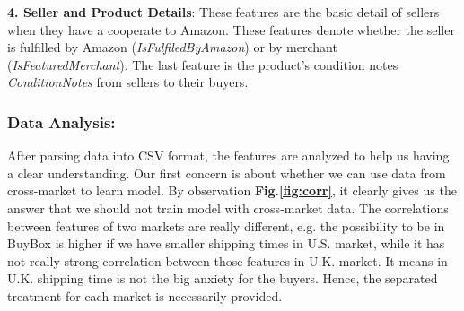 \textbf{4. Seller and Product Details}: These features are the basic detail of sellers when they have a cooperate to Amazon. These features denote whether the seller is fulfilled by Amazon (\textit{IsFulfiledByAmazon}) or by merchant (\textit{IsFeaturedMerchant}). The last feature is the product's condition notes \textit{ConditionNotes} from sellers to their buyers.

\subsubsection{Data Analysis:}
\label{sec:dataanalysis}

After parsing data into CSV format, the features are analyzed to help us having a clear understanding. Our first concern is about whether we can use data from cross-market to learn model. By observation \textbf{Fig.\ref{fig:corr}}, it clearly gives us the answer that we should not train model with cross-market data. The correlations between features of two markets are really different, e.g. the possibility to be in BuyBox is higher if we have smaller shipping times in U.S. market, while it has not really strong correlation between those features in U.K. market. It means in U.K. shipping time is not the big anxiety for the buyers.  Hence, the separated treatment for each market is necessarily provided.

